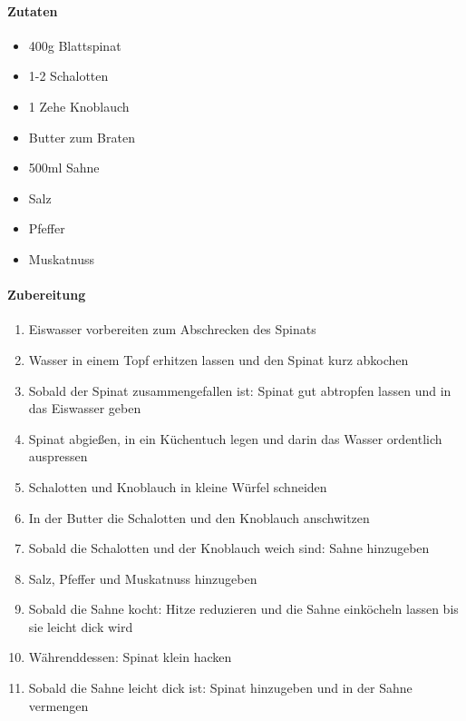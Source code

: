 \newpage
{}
\paragraph{Zutaten}
\begin{itemize}[noitemsep]
	\item 400g Blattspinat
	\item 1-2 Schalotten
	\item 1 Zehe Knoblauch
	\item Butter zum Braten
	\item 500ml Sahne
	\item Salz
	\item Pfeffer
	\item Muskatnuss
\end{itemize}


\paragraph{Zubereitung}
\begin{enumerate}[noitemsep]
	\item Eiswasser vorbereiten zum Abschrecken des Spinats 
	\item Wasser in einem Topf erhitzen lassen und den Spinat kurz abkochen
	\item Sobald der Spinat zusammengefallen ist: Spinat gut abtropfen lassen und in das Eiswasser geben
	\item Spinat abgießen, in ein Küchentuch legen und darin das Wasser ordentlich auspressen
	\item Schalotten und Knoblauch in kleine Würfel schneiden
	\item In der Butter die Schalotten und den Knoblauch anschwitzen
	\item Sobald die Schalotten und der Knoblauch weich sind: Sahne hinzugeben
	\item Salz, Pfeffer und Muskatnuss hinzugeben
	\item Sobald die Sahne kocht: Hitze reduzieren und die Sahne einköcheln lassen bis sie leicht dick wird
	\item Währenddessen: Spinat klein hacken
	\item Sobald die Sahne leicht dick ist: Spinat hinzugeben und in der Sahne vermengen
\end{enumerate}

